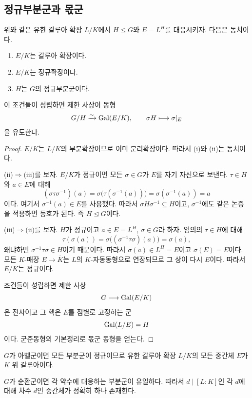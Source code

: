\subsection{정규부분군과 몫군}

\begin{theorem}
위와 같은 유한 갈루아 확장 $L/K$에서 $H\le G$와 $E=L^H$를 대응시키자. 다음은 동치이다.
\begin{enumerate}[label=(\roman*)]
  \item $E/K$는 갈루아 확장이다.
  \item $E/K$는 정규확장이다.
  \item $H$는 $G$의 정규부분군이다.
\end{enumerate}
이 조건들이 성립하면 제한 사상이 동형
\[
  G/H\xrightarrow{\sim}\operatorname{Gal}(E/K),
  \qquad
  \sigma H\longmapsto\sigma|_E
\]
을 유도한다.
\end{theorem}

\begin{proof}
$E/K$는 $L/K$의 부분확장이므로 이미 분리확장이다. 따라서 (i)와 (ii)는 동치이다.

(ii)$\Rightarrow$(iii)를 보자. $E/K$가 정규이면 모든 $\sigma\in G$가 $E$를 자기 자신으로 보낸다. $\tau\in H$와 $a\in E$에 대해
\[
  (\sigma\tau\sigma^{-1})(a)
  =\sigma\bigl(\tau(\sigma^{-1}(a))\bigr)
  =\sigma(\sigma^{-1}(a))=a
\]
이다. 여기서 $\sigma^{-1}(a)\in E$를 사용했다. 따라서 $\sigma H\sigma^{-1}\subseteq H$이고, $\sigma^{-1}$에도 같은 논증을 적용하면 등호가 된다. 즉 $H\trianglelefteq G$이다.

(iii)$\Rightarrow$(ii)를 보자. $H$가 정규이고 $a\in E=L^H$, $\sigma\in G$라 하자. 임의의 $\tau\in H$에 대해
\[
  \tau(\sigma(a))
  =\sigma\bigl((\sigma^{-1}\tau\sigma)(a)\bigr)
  =\sigma(a),
\]
왜냐하면 $\sigma^{-1}\tau\sigma\in H$이기 때문이다. 따라서 $\sigma(a)\in L^H=E$이고 $\sigma(E)=E$이다. 모든 $K$-매장 $E\to\overline K$는 $L$의 $K$-자동동형으로 연장되므로 그 상이 다시 $E$이다. 따라서 $E/K$는 정규이다.

조건들이 성립하면 제한 사상
\[
  G\longrightarrow\operatorname{Gal}(E/K)
\]
은 전사이고 그 핵은 $E$를 점별로 고정하는 군
\[
  \operatorname{Gal}(L/E)=H
\]
이다. 군준동형의 기본정리로 몫군 동형을 얻는다.
\end{proof}

\begin{corollary}
$G$가 아벨군이면 모든 부분군이 정규이므로 유한 갈루아 확장 $L/K$의 모든 중간체 $E$가 $K$ 위 갈루아이다.
\end{corollary}

\begin{corollary}
$G$가 순환군이면 각 약수에 대응하는 부분군이 유일하다. 따라서 $d\mid[L:K]$인 각 $d$에 대해 차수 $d$인 중간체가 정확히 하나 존재한다.
\end{corollary}


